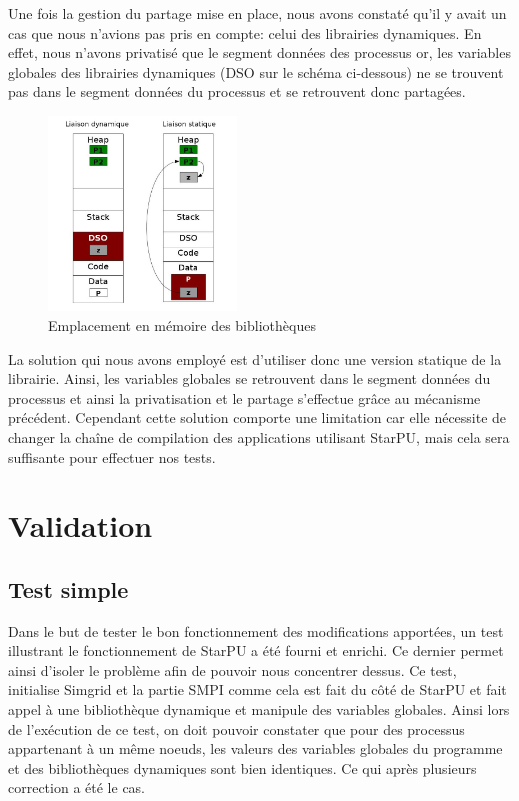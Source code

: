 \documentclass[smallextended]{svjour3}
\begin{document}
Une fois la gestion du partage mise en place, nous avons constaté
qu'il y avait un cas que nous n'avions pas pris en compte: celui des
librairies dynamiques. En effet, nous n'avons privatisé que le
segment données des processus or, les variables globales des
librairies dynamiques (DSO sur le schéma ci-dessous) ne se trouvent
pas dans le segment données du processus et se retrouvent donc
partagées. 

\begin{figure}[htb]
\centering
\includegraphics[width=5cm]{./Img/StaticDyn.jpg}
\caption{\label{fig:2}Emplacement en mémoire des bibliothèques}
\end{figure}

La solution qui nous avons employé est d'utiliser donc une version
statique de la librairie. Ainsi, les variables globales se
retrouvent dans le segment données du processus et ainsi la
privatisation et le partage s'effectue grâce au mécanisme
précédent. Cependant cette solution comporte une limitation car elle
nécessite de changer la chaîne de compilation des applications
utilisant StarPU, mais cela sera suffisante pour effectuer nos tests. 

\section{Validation}
\label{sec-6}
\subsection{Test simple}
\label{sec-6-1}
Dans le but de tester le bon fonctionnement des modifications
apportées, un test illustrant le fonctionnement de StarPU a été
fourni et enrichi. Ce dernier permet ainsi d'isoler le problème
afin de pouvoir nous concentrer dessus. Ce test, initialise Simgrid
et la partie SMPI comme cela est fait du côté de StarPU et fait
appel à une bibliothèque dynamique et manipule des variables
globales. Ainsi lors de l'exécution de ce test, on doit pouvoir
constater que pour des processus appartenant à un même noeuds, les
valeurs des variables globales du programme et des bibliothèques
dynamiques sont bien identiques. Ce qui après plusieurs correction
a été le cas.  
\end{document}
